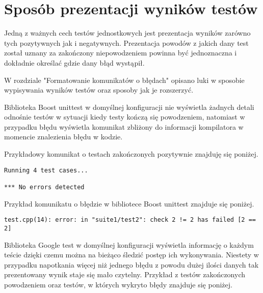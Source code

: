 \documentclass[12pt,a4paper,notitlepage]{report}
\begin{document}
\chapter{Sposób prezentacji wyników testów}

Jedną z ważnych cech testów jednostkowych jest prezentacja wyników zarówno tych pozytywnych jak i negatywnych. Prezentacja powodów z jakich dany test został uznany za zakończony niepowodzeniem powinna być jednoznaczna i dokładnie określać gdzie dany błąd wystąpił.

W rozdziale "Formatowanie komunikatów o błędach" opisano luki w sposobie wypisywania wyników testów oraz sposoby jak je rozszerzyć.

Biblioteka Boost unittest w domyślnej konfiguracji nie wyświetla żadnych detali odnośnie testów w sytuacji kiedy testy kończą się powodzeniem, natomiast w przypadku błędu wyświetla komunikat zbliżony do informacji kompilatora w momencie znalezienia błędu w kodzie.

Przykładowy komunikat o testach zakończonych pozytywnie znajduję się poniżej.
\begin{lstlisting}[label=some-code,caption=Przykłądowy pozytywny wynik testu w bibliotece Boost unittest]
Running 4 test cases...

*** No errors detected
		\end{lstlisting}

Przykład komunikatu o błędzie w bibliotece Boost unittest znajduje się poniżej.
\begin{lstlisting}[label=some-code,caption=Przykłądowy negatywny wynik testu w bibliotece Boost unittest]
test.cpp(14): error: in "suite1/test2": check 2 != 2 has failed [2 == 2]
		\end{lstlisting}

Biblioteka Google test w domyślnej konfiguracji wyświetla informację o każdym teście dzięki czemu można na bieżąco śledzić postęp ich wykonywania. Niestety w przypadku napotkania więcej niż jednego błędu z powodu dużej ilości danych tak prezentowany wynik staje się mało czytelny. Przykład z testów zakończonych powodzeniem oraz testów, w których wykryto błędy znajduje się poniżej.
\end{document}
